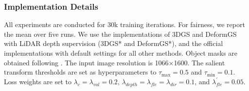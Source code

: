 \documentclass[letterpaper, 10 pt, conference]{ieeeconf}  %
\begin{document}

\subsubsection{Implementation Details}


All experiments are conducted for 30k training iterations. For fairness, we report the mean over five runs. We use the implementations of 3DGS and DeformGS with LiDAR depth supervision (3DGS* and DeformGS*), and the official implementations with default settings for all other methods. Object masks are obtained following \cite{ref21}. The input image resolution is 1066×1600. The salient transform thresholds are set as hyperparameters to $\tau_{\text{max}}=0.5$ and $\tau_{\text{min}}=0.1$. Loss weights are set to $\lambda_{c}=\lambda_{val}=0.2$, $\lambda_{depth}=\lambda_{fle}=\lambda_{dir}=0.1$, and $\lambda_{fle}^{\prime}=0.05$.
\end{document}
